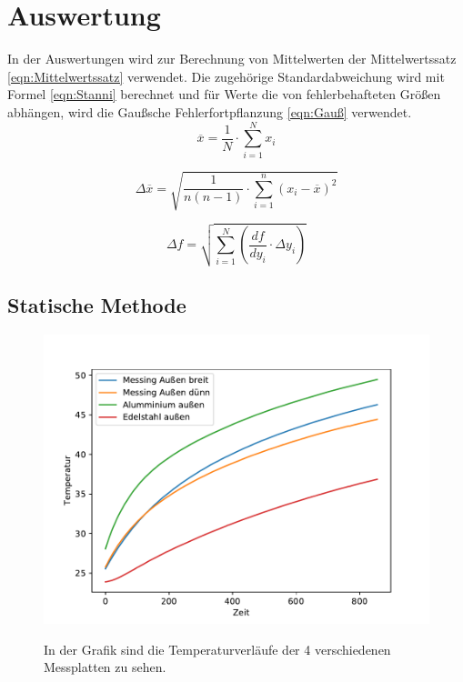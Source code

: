 \documentclass[titlepage = firstcover]{scrartcl}
\begin{document}
    \FloatBarrier

  \section{Auswertung}
    In der Auswertungen wird zur Berechnung von Mittelwerten der Mittelwertssatz \eqref{eqn:Mittelwertssatz} verwendet. Die zugehörige Standardabweichung 
    wird mit Formel \eqref{eqn:Stanni} berechnet und für Werte die von fehlerbehafteten Größen abhängen, wird die Gaußsche Fehlerfortpflanzung 
    \eqref{eqn:Gauß} verwendet.
    \begin{equation}
      \overline{x} = \frac{1}{N} \cdot \sum_{i=1}^{N} x_i
      \label{eqn:Mittelwertssatz}
    \end{equation}

    \begin{equation}
      \Delta \overline{x} = \sqrt{\frac{1}{n(n-1)} \cdot \sum_{i=1}^n (x_i - \overline{x})^2}
      \label{eqn:Stanni}
    \end{equation}
    
    \begin{equation}  
      \Delta f = \sqrt{\sum_{i=1}^N \left(\frac{df}{dy_i} \cdot \Delta y_i \right)}
      \label{eqn:Gauß}
    \end{equation}  




  \subsection{Statische Methode}
  \begin{figure}
    \centering
    \caption{In der Grafik sind die Temperaturverläufe der 4 verschiedenen Messplatten zu sehen.}
    \includegraphics{Tstatisch.pdf}
    \label{fig:Tstat}
  \end{figure}
\end{document}
